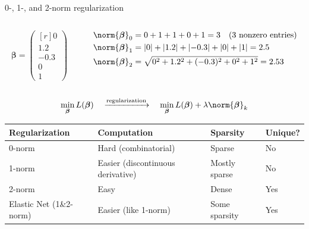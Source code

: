 \documentclass[9pt]{beamer}
\begin{document}
\begin{frame}{0-, 1-, and 2-norm regularization}
\begin{columns}
\begin{column}{0.3\textwidth}
	\[ \boldsymbol{\beta} = \begin{pmatrix*}[r] 0 \\ 1.2 \\ -0.3 \\ 0 \\ 1\end{pmatrix*} \]
\end{column}
\begin{column}{0.7\textwidth}
	\begin{align*}
		\norm{\boldsymbol{\beta}}_0 &= 0 + 1 + 1 + 0 + 1 = 3 \quad\text{(3 nonzero entries)} \\
		\norm{\boldsymbol{\beta}}_1 &= |0| + |1.2| + \lvert-0.3| + |0| + |1| = 2.5 \\
		\norm{\boldsymbol{\beta}}_2 &= \sqrt{0^2 + 1.2^2 + (-0.3)^2 + 0^2 + 1^2} = 2.53
	\end{align*}
\end{column}
\end{columns}

\pause
\bigskip\bigskip
\[ \min_{\boldsymbol{\beta}} L(\boldsymbol{\beta}) \quad\xrightarrow{\text{regularization}}\quad \min_{\boldsymbol{\beta}} L(\boldsymbol{\beta}) + \lambda \norm{\boldsymbol{\beta}}_k \]

\pause
\vspace{0.3in}
\begin{center}
	{\footnotesize
		\begin{tabular}{llll}
			\toprule
			\textbf{Regularization} & \textbf{Computation} & \textbf{Sparsity} & \textbf{Unique?} \\
			\midrule
			0-norm & Hard (combinatorial) & Sparse & No \\
			1-norm & Easier (discontinuous derivative) & Mostly sparse & No \\
			2-norm & Easy & Dense & Yes \\
			Elastic Net (1\&2-norm) & Easier (like 1-norm) & Some sparsity & Yes \\
			\bottomrule 	
		\end{tabular}
	}
\end{center}
	
\end{frame}
\end{document}
